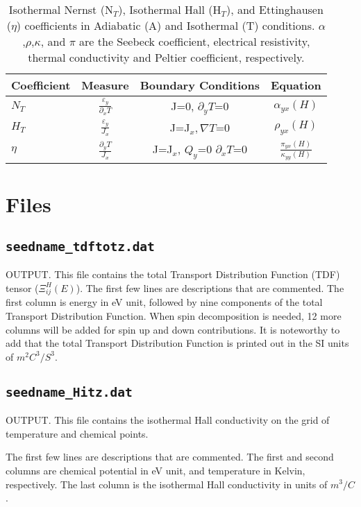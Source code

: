 \begin{table}
 \caption{Isothermal Nernst (N$_{T}$), Isothermal Hall (H$_{T}$), and Ettinghausen ($\eta$) coefficients in Adiabatic (A) and Isothermal (T) conditions. $\alpha$,$\rho$,$\kappa$, and $\pi$ are the Seebeck coefficient, electrical resistivity, thermal conductivity and Peltier coefficient, respectively.}
 \centering
 \noindent
 \begin{tabular}{lccc} %
    \hline
    \hline
    \textbf{Coefficient} &\textbf{Measure} &\textbf{Boundary Conditions} & \textbf{Equation}  \\
    \hline
    \hline
   $N_{T}$  & $\frac{\varepsilon_y}{\partial_x T}$ & J=0, $ \partial_yT\textbf{=}0$ & $\alpha_{yx}(H)$   \\
    $H_{T}$  & $\frac{\varepsilon_y}{J_x }$ &  J=J$_x, \nabla T\textbf{=}0$ & $\rho _{yx}(H)$ \\
    $\eta$    & $\frac{\partial_yT}{J_x}$ &  J=J$_x$, $Q_y\textbf{=}0$ $\partial_xT\textbf{=}0$ & $\frac{\pi_{yx}(H)}{\kappa_{yy}(H)}$\\
    \hline  
    \hline 
 \end{tabular}
 \label{TMco}
\end{table}

\section{Files}

\subsection{{\tt seedname\_tdftotz.dat}}
OUTPUT. This file contains the total Transport Distribution Function (TDF) tensor ($\Xi_{ij}^H(E)$). The first few lines are descriptions that are commented. The first column is energy in eV unit, followed by nine components of the total Transport Distribution Function. When spin decomposition is needed, 12  more columns will be added for spin up and down contributions.  It is noteworthy to add that the total Transport Distribution Function is printed out in the SI units of  $m^2C^3/S^3$.  

\subsection{{\tt seedname\_Hitz.dat}}
OUTPUT. This file contains the isothermal Hall conductivity on the grid of temperature and chemical points. 

The first few lines are descriptions that are commented. The first and second columns are chemical potential in eV unit, and temperature in Kelvin, respectively. The last column is the isothermal Hall conductivity in units of $m^3/C$. 

